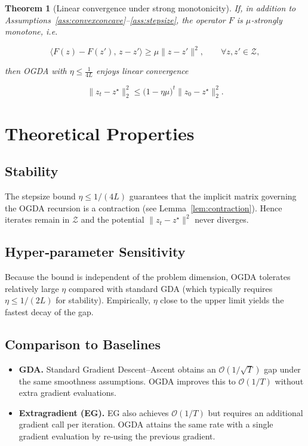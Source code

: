 \documentclass{article}
\newtheorem{theorem}{Theorem}
\begin{document}
\begin{theorem}[Linear convergence under strong monotonicity]\label{thm:linear}
If, in addition to Assumptions~\ref{ass:convexconcave}–\ref{ass:stepsize}, the operator $F$ is $\mu$‑strongly monotone, i.e.  

\[
\langle F(z)-F(z'),\,z-z'\rangle\ge\mu\|z-z'\|^2,\qquad\forall z,z'\in\mathcal Z,
\]

then OGDA with $\eta\le\frac{1}{4L}$ enjoys linear convergence  

\[
\|z_t-z^\star\|_2^2\le\bigl(1-\eta\mu\bigr)^t\|z_0-z^\star\|_2^2 .
\] 
\end{theorem}

\section{Theoretical Properties}
\subsection{Stability}
The stepsize bound $\eta\le 1/(4L)$ guarantees that the implicit matrix governing the OGDA recursion is a contraction (see Lemma~\ref{lem:contraction}). Hence iterates remain in $\mathcal Z$ and the potential $\|z_t-z^\star\|^2$ never diverges.

\subsection{Hyper‑parameter Sensitivity}
Because the bound is independent of the problem dimension, OGDA tolerates relatively large $\eta$ compared with standard GDA (which typically requires $\eta\le 1/(2L)$ for stability). Empirically, $\eta$ close to the upper limit yields the fastest decay of the gap.

\subsection{Comparison to Baselines}
\begin{itemize}
\item \textbf{GDA.} Standard Gradient Descent–Ascent obtains an $\mathcal O(1/\sqrt{T})$ gap under the same smoothness assumptions. OGDA improves this to $\mathcal O(1/T)$ without extra gradient evaluations.
\item \textbf{Extragradient (EG).} EG also achieves $\mathcal O(1/T)$ but requires an additional gradient call per iteration. OGDA attains the same rate with a single gradient evaluation by re‑using the previous gradient.
\end{itemize}
\end{document}
